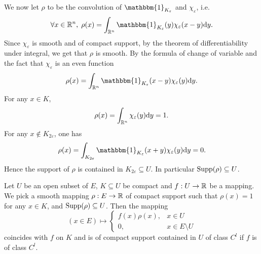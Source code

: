 \begin{proofenv}
    \quad We now let $\rho$ to be the convolution of $\mathbbm{1}_{K_{\varepsilon}}$ and $\chi_{\varepsilon}$, i.e.
    $$\forall x \in \RR^n,\; \rho(x) = \int_{\RR^n} \mathbbm{1}_{K_{\varepsilon}}(y)\chi_{\varepsilon}(x-y)\dd y.$$
    Since $\chi_{\varepsilon}$ is smooth and of compact support, by the theorem of differentiability under integral,
    we get that $\rho$ is smooth.
    By the formula of change of variable and the fact that $\chi_{\varepsilon}$ is an even function
    $$\rho(x) = \int_{\RR^n} \mathbbm{1}_{K_{\varepsilon}} (x - y)\chi_{\varepsilon} (y) \dd y.$$
    For any $x \in K$,
    $$\rho(x) = \int_{\mathbb{R}^n} \chi_{\varepsilon}(y) \mathrm{d} y = 1.$$
    For any $x \notin K_{2\varepsilon}$, one has
    $$\rho(x) = \int_{K_{2\varepsilon}} \mathbbm{1}_{K_{\varepsilon}}(x+y)\chi_{\varepsilon}(y) \dd y = 0.$$
    Hence the support of $\rho$ is contained in $K_{2\varepsilon} \subseteq U$.
    In particular $\operatorname{\mathrm{Supp}}(\rho) \subseteq U$.
\end{proofenv}

\begin{remark}
    Let $U$ be an open subset of $E$, $K \subseteq U$ be compact and $f : U \rightarrow \mathbb{R}$ be a mapping.
    We pick a smooth mapping $\rho : E \rightarrow \mathbb{R}$ of compact support such that $\rho(x) = 1$ for any $x \in K$,
    and $\operatorname{\mathrm{Supp}}(\rho) \subseteq U$.
    Then the mapping
    $$(x \in E) \longmapsto \begin{cases}
        f(x) \rho(x), & x \in U\\
        0, & x \in E \setminus U
    \end{cases}$$
    coincides with $f$ on $K$ and is of compact support contained in $U$ of class $C^l$ if $f$ is of class $C^l$.
\end{remark}

